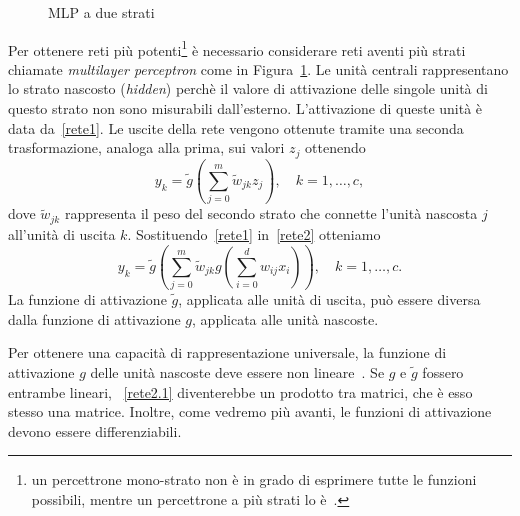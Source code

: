\documentclass[11pt,a4paper,twoside,
openright]{book}
\begin{document}
\begin{figure}
\begin{center}
\caption{MLP a due strati}
\label{fig:MLP2}
\end{center}
\end{figure}
Per ottenere reti più potenti\footnote{un percettrone mono-strato non è in grado di esprimere tutte le funzioni possibili, mentre un percettrone a più strati lo è~\cite{cybenko}.} è necessario considerare reti aventi più strati chiamate \textit{multilayer perceptron} come in Figura~\ref{fig:MLP2}. Le unità centrali rappresentano lo strato nascosto (\textit{hidden}) perchè il valore di attivazione delle singole unità di questo strato non sono misurabili dall'esterno. L'attivazione di queste unità è data da~\eqref{rete1}. Le uscite della rete vengono ottenute tramite una seconda trasformazione, analoga alla prima, sui valori $z_j$ ottenendo
\begin{equation}
y_k = \tilde{g}\left(\sum\limits_{j=0}^m \tilde{w}_{jk}z_j\right), \quad
k=1,\dots,c,
\label{rete2}
\end{equation}
dove $\tilde{w}_{jk}$ rappresenta il peso del secondo strato che connette l'unità nascosta $j$ all'unità di uscita $k$. Sostituendo~\eqref{rete1} in~\eqref{rete2} otteniamo
\begin{equation}
y_k = \tilde{g}\left( \sum\limits_{j=0}^m \tilde{w}_{jk}g\left(\sum\limits_{i=0}^d w_{ij}x_i\right) \right), \quad
k=1,\dots,c.
\label{rete2.1}
\end{equation}
La funzione di attivazione $\tilde{g}$, applicata alle unità di uscita, può essere diversa dalla funzione di attivazione $g$, applicata alle unità nascoste.

Per ottenere una capacità di rappresentazione universale, la funzione di attivazione $g$ delle unità nascoste deve essere non lineare~\cite{cybenko}. Se $g$ e $\tilde{g}$ fossero entrambe lineari, ~\eqref{rete2.1} diventerebbe un prodotto tra matrici, che è esso stesso una matrice. Inoltre, come vedremo più avanti, le funzioni di attivazione devono essere differenziabili.
\end{document}
